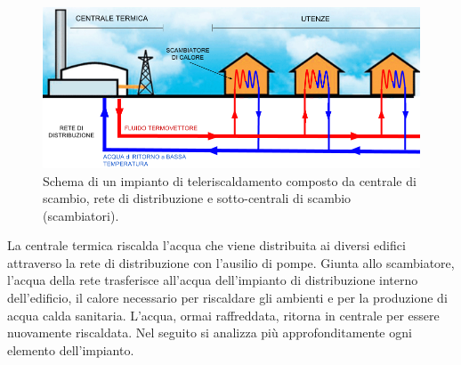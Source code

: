 \documentclass[laurea,oneside,11pt]{USiena_tesiLM}
\begin{document}
\begin{figure}[!ht]
\centering
\includegraphics[width=1.0\textwidth]{figure/schema_impianto1}
\caption{Schema di un impianto di teleriscaldamento composto da centrale di scambio, rete di distribuzione e sotto-centrali di scambio (scambiatori).}
\label{fig:schema1}
\end{figure}

La centrale termica riscalda l'acqua che viene distribuita ai diversi edifici attraverso la rete di distribuzione con l'ausilio di pompe. Giunta allo scambiatore, l'acqua della rete trasferisce all'acqua dell'impianto di distribuzione interno dell'edificio, il calore necessario per riscaldare gli ambienti e per la produzione di acqua calda sanitaria. L'acqua, ormai raffreddata, ritorna in centrale per essere nuovamente riscaldata. 
Nel seguito si analizza più approfonditamente ogni elemento dell'impianto.
\end{document}
